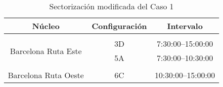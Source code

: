 \begin{table}[h]
	\centering
	\caption{Sectorización modificada del Caso 1}
	\begin{tabular}{ccc}
		\hline
		\textbf{Núcleo}                                           & \textbf{Configuración} & \textbf{Intervalo}   \\ \hline
		\multicolumn{1}{l}{}                                      & \multicolumn{1}{l}{}   & \multicolumn{1}{l}{} \\
		\multicolumn{1}{c|}{\multirow{2}{*}{Barcelona Ruta Este}} & 3D                     & 7:30:00--15:00:00    \\
		\multicolumn{1}{c|}{}                                     & 5A                     & 7:30:00--10:30:00    \\
		\multicolumn{1}{l}{}                                      & \multicolumn{1}{l}{}   & \multicolumn{1}{l}{} \\
		Barcelona Ruta Oeste                                      & 6C                     & 10:30:00--15:00:00   \\ \hline
	\end{tabular}
	\label{table:5:caso1-modif}
\end{table}





